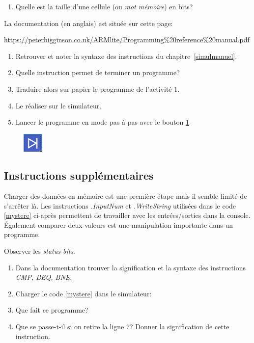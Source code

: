 \documentclass[a4paper,11pt]{article}
\begin{document}
\begin{Form}
\begin{activite}
\begin{enumerate}
\item Quelle est la taille d'une cellule (ou \emph{mot mémoire}) en bits?
\end{enumerate}
\end{activite}
La documentation (en anglais) est située sur cette page:
\begin{center}
\url{https://peterhigginson.co.uk/ARMlite/Programming%20reference%20manual.pdf}
\end{center}
\begin{activite}
\begin{enumerate}
\item Retrouver et noter la syntaxe des instructions du chapitre~\ref{simulmanuel}.
\item Quelle instruction permet de terminer un programme?
\item Traduire alors sur papier le programme de l'activité 1.
\item Le réaliser sur le simulateur.
\item Lancer le programme en mode pas à pas avec le bouton \ref{pasapas}
\end{enumerate}
\end{activite}
\begin{figure}[!h]
\centering
\includegraphics[width=1cm]{ressources/pasapas.png}
\label{pasapas}
\end{figure}
\subsection{Instructions supplémentaires}
Charger des données en mémoire est une première étape mais il semble limité de s'arrêter là. Les instructions \emph{.InputNum} et \emph{.WriteString} utilisées dans le code \ref{mystere} ci-après permettent de travailler avec les entrées/sorties dans la console.\\Également comparer deux valeurs est une manipulation importante dans un programme.
\begin{commentprof}
Observer les \emph{status bits}.
\end{commentprof}
\begin{activite}
\begin{enumerate}
\item Dans la documentation trouver la signification et la syntaxe des instructions \emph{CMP, BEQ, BNE}.
\item Charger le code \ref{mystere} dans le simulateur:

\item Que fait ce programme?
\item Que se passe-t-il si on retire la ligne 7? Donner la signification de cette instruction.
\end{enumerate}
\end{activite}

\end{Form}
\end{document}
